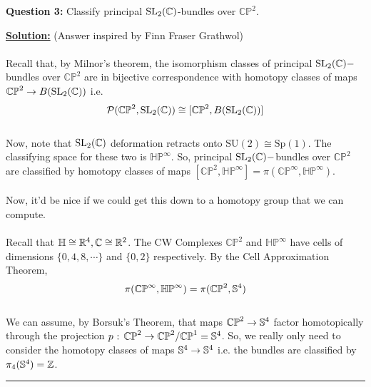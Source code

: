 \documentclass[11pt]{article}
\begin{document}
\begin{bluebox}
  \textbf{Question 3:} Classify principal $\mathrm{SL}_2(\mathbb{C})$-bundles over $\mathbb{CP}^2$.
\end{bluebox}

\vskip 0.5cm
\textbf{\underline{Solution:}} (Answer inspired by Finn Fraser Grathwol)
\\
\\
Recall that, by Milnor's theorem, the isomorphism classes of principal $\mathrm{SL}_2(\mathbb{C})-$bundles over $\mathbb{CP}^2$ are in bijective correspondence with homotopy classes of maps $\mathbb{CP}^2 \rightarrow B(\mathrm{SL}_2(\mathbb{C}))$ i.e. 
$$ \mathcal{P}(\mathbb{CP}^2, \mathrm{SL}_2(\mathbb{C})) \cong [\mathbb{CP}^2, B(\mathrm{SL}_2(\mathbb{C} ))]  $$
\\
Now, note that $\mathrm{SL}_2(\mathbb{C})$ deformation retracts onto $\mathrm{SU}(2) \cong \mathrm{Sp}(1)$. The classifying space for these two is $\mathbb{HP}^{\infty}$. So, principal $\mathrm{SL}_2(\mathbb{C})-$bundles over $\mathbb{CP}^2$ are classified by homotopy classes of maps $[\mathbb{CP}^{2}, \mathbb{HP}^{\infty}] = \pi(\mathbb{CP}^{\infty}, \mathbb{HP}^{\infty})$.
\\
\\
Now, it'd be nice if we could get this down to a homotopy group that we can compute. 
\\
\\
Recall that $\mathbb{H} \cong \mathbb{R}^4, \mathbb{C} \cong \mathbb{R}^2$. The CW Complexes $\mathbb{CP}^{2}$ and $\mathbb{HP}^{\infty}$ have cells of dimensions $\{0,4,8,\cdots\}$ and $\{0,2\}$ respectively. By the Cell Approximation Theorem, $$ \pi(\mathbb{CP}^{\infty}, \mathbb{HP}^{\infty}) = \pi(\mathbb{CP}^2, \mathbb{S}^4) $$
\\
We can assume, by Borsuk's Theorem, that maps $\mathbb{CP}^2 \rightarrow \mathbb{S}^4$ factor homotopically through the projection $p \text{ : }\mathbb{CP}^2 \rightarrow \mathbb{CP}^2 / \mathbb{CP}^1 = \mathbb{S}^4$. So, we really only need to consider the homotopy classes of maps $\mathbb{S}^4 \rightarrow \mathbb{S}^4$ i.e. the bundles are classified by $\pi_4(\mathbb{S}^4) = \mathbb{Z}$.


\vskip 0.5cm
\hrule
\pagebreak










% 
\end{document}
